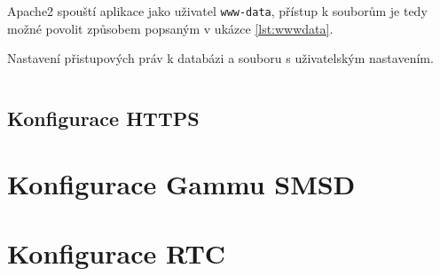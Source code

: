 Apache2 spouští aplikace jako uživatel \texttt{www-data}, přístup k souborům je tedy možné povolit způsobem popsaným v ukázce \ref{lst:wwwdata}.

\begin{listing}[htbp]
\caption{\label{lst:wwwdata} Nastavení přistupových práv k databázi a souboru s uživatelským nastavením.}
\inputminted[bgcolor=codebg]{bash}{source-samples/wwwdata.sh}
\end{listing}


\subsection{Konfigurace HTTPS}


\section{Konfigurace Gammu SMSD}

\section{Konfigurace RTC}